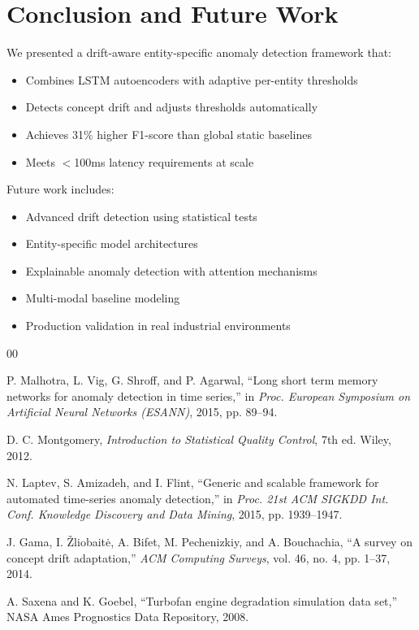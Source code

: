 \documentclass[conference]{IEEEtran}
\begin{document}
\section{Conclusion and Future Work}

We presented a drift-aware entity-specific anomaly detection framework that:

\begin{itemize}
\item Combines LSTM autoencoders with adaptive per-entity thresholds
\item Detects concept drift and adjusts thresholds automatically
\item Achieves 31\% higher F1-score than global static baselines
\item Meets $<$100ms latency requirements at scale
\end{itemize}

Future work includes:
\begin{itemize}
\item Advanced drift detection using statistical tests
\item Entity-specific model architectures
\item Explainable anomaly detection with attention mechanisms
\item Multi-modal baseline modeling
\item Production validation in real industrial environments
\end{itemize}

\begin{thebibliography}{00}

 P. Malhotra, L. Vig, G. Shroff, and P. Agarwal, ``Long short term memory networks for anomaly detection in time series,'' in \textit{Proc. European Symposium on Artificial Neural Networks (ESANN)}, 2015, pp. 89--94.

 D. C. Montgomery, \textit{Introduction to Statistical Quality Control}, 7th ed. Wiley, 2012.

 N. Laptev, S. Amizadeh, and I. Flint, ``Generic and scalable framework for automated time-series anomaly detection,'' in \textit{Proc. 21st ACM SIGKDD Int. Conf. Knowledge Discovery and Data Mining}, 2015, pp. 1939--1947.

 J. Gama, I. Žliobaitė, A. Bifet, M. Pechenizkiy, and A. Bouchachia, ``A survey on concept drift adaptation,'' \textit{ACM Computing Surveys}, vol. 46, no. 4, pp. 1--37, 2014.

 A. Saxena and K. Goebel, ``Turbofan engine degradation simulation data set,'' NASA Ames Prognostics Data Repository, 2008.

\end{thebibliography}

\vspace{12pt}
\end{document}
